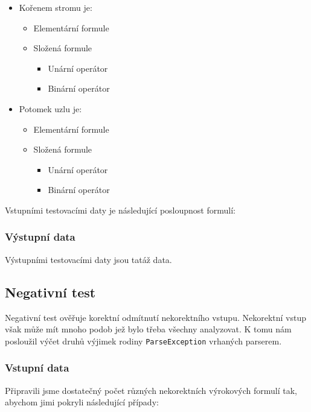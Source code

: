\documentclass[thesis=B,czech,hidelinks]{thesis}[2012/06/26]
\begin{document}
\begin{itemize}
	\item Kořenem stromu je:
	\begin{itemize}
		\item Elementární formule
		\item Složená formule
		\begin{itemize}
			\item Unární operátor
			\item Binární operátor
		\end{itemize}
	\end{itemize}
	\item Potomek uzlu je:
	\begin{itemize}
		\item Elementární formule
		\item Složená formule
		\begin{itemize}
			\item Unární operátor
			\item Binární operátor
		\end{itemize}
	\end{itemize}
\end{itemize}

Vstupními testovacími daty je následující posloupnost formulí:



\subsubsection{Výstupní data}

Výstupními testovacími daty jsou tatáž data.

\subsection{Negativní test}

Negativní test ověřuje korektní odmítnutí nekorektního vstupu. Nekorektní vstup však může mít mnoho podob jež bylo třeba všechny analyzovat. K tomu nám posloužil výčet druhů výjimek rodiny \texttt{ParseException} vrhaných parserem.

\subsubsection{Vstupní data}

Připravili jsme dostatečný počet různých nekorektních výrokových formulí tak, abychom jimi pokryli následující případy:
\end{document}
